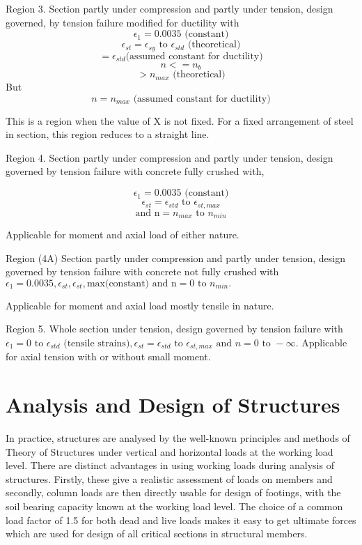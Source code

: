 Region 3. Section partly under compression and partly under tension,
design governed, by tension failure modiﬁed for ductility with
$$\epsilon_1 = 0.0035 \text{ (constant)}$$
$$\epsilon_{st} =\epsilon_{sy} \text{ to } \epsilon_{std}
\text{ (theoretical)}$$
$$=\epsilon_{std} \text{(assumed constant for ductility)}$$
$$n<= n_b$$
$$>n_{max} \text{ (theoretical)}$$
But $$n=n_{max} \text{ (assumed constant for ductility)}$$

This is a region when the value of X is not fixed. For a fixed arrangement
of steel in section, this region reduces to a straight line. 

Region 4. Section partly under compression and partly under tension, design
governed by tension failure with concrete fully crushed with,

$$\epsilon_1 = 0.0035 \text{ (constant)}$$
$$\epsilon_{st} = \epsilon_{std} \text{ to } \epsilon_{st,max}$$
$$\text{and n} = n_{max} \text{ to } n_{min}$$

Applicable for moment and axial load of either nature.

Region (4A) Section partly under compression and partly under tension,
design governed by tension failure with concrete not fully crushed with
$\epsilon_1 = 0.0035,\epsilon_{st},\epsilon_{st},
\text{max(constant) and n} = 0 \text{ to } n_{min}.$

Applicable for moment and axial load mostly tensile in nature.

Region 5. Whole section under tension, design governed by tension failure with 
$\epsilon_1 = 0 \text{ to }\epsilon_{std} \text{ (tensile strains)},
\epsilon_{st}=\epsilon_{std} \text{ to } \epsilon_{st,max} \text{ and } n =
0 \text{ to } -\infty.$
Applicable for axial tension with or without small moment.

\section{Analysis and Design of Structures}

In practice, structures are analysed by the well-known principles and
methods of Theory of Structures under vertical and horizontal loads at the
working load level. There are distinct advantages in using working loads
during analysis of structures. Firstly, these give a realistic assessment
of loads on members and secondly, column loads are then directly usable
for design of footings, with the soil bearing capacity known at the working
load level. The choice of a common load factor of 1.5 for both dead and
live loads makes it easy to get ultimate forces which are used for
design of all critical sections in structural members.


